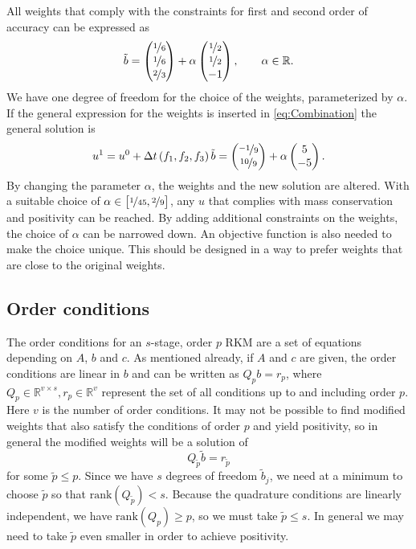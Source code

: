 \documentclass[a4paper]{article}
\numberwithin{equation}{section}
\theoremstyle{plain}
\theoremstyle{definition}
\numberwithin{theorem}{section}
\newcommand{\R}{\mathbb{R}}
\newcommand{\dt}{{\Delta t}}
\newcommand{\1}{\mathbbm{1}}
\newcommand{\bt}{\tilde{b}}
\newcommand{\pt}{{\tilde{p}}}
\begin{document}
All weights that comply with the constraints for first and second
order of accuracy can be expressed as
\begin{equation}
  \bt =
  \begin{pmatrix}
    \nicefrac{1}{6} \\
    \nicefrac{1}{6} \\
    \nicefrac{2}{3}
  \end{pmatrix}
  + \alpha \begin{pmatrix}
    \nicefrac{1}{2} \\
    \nicefrac{1}{2} \\
    -1
  \end{pmatrix},
  \qquad
  \alpha \in \R.
\end{equation}
We have one degree of freedom for the choice of the weights,
parameterized by $\alpha$.
If the general expression for the weights is inserted in
\eqref{eq:Combination} the general solution is
\begin{equation}
  u^{1}
  =
  u^0 + \dt \left(f_1, f_2, f_3\right) \bt
  =
  \begin{pmatrix}
    \nicefrac{-1}{9} \\
    \nicefrac{10}{9}
  \end{pmatrix}
  +\alpha \begin{pmatrix}
    5 \\
    -5
  \end{pmatrix}.
\end{equation}
By changing the parameter $\alpha$, the weights and the new
solution are altered. With a suitable choice of
$\alpha \in \left[ \nicefrac{1}{45}, \nicefrac{2}{9} \right]$,
any $u$ that complies with mass conservation and positivity can
be reached.
By adding additional constraints on the weights, the choice of
$\alpha$ can be narrowed down.
An objective function is also needed to make the choice unique. This should be designed in a way to prefer weights that are close to the original weights.


\subsection{Order conditions}\label{sec:OrderCond}

The order conditions for an $s$-stage, order $p$ RKM are a set of equations depending on $A$, $b$ and
$c$.  As mentioned already, if $A$ and $c$ are given, the order conditions are
linear in $b$ and can be written as $Q_p b = r_p$, where
$Q_p\in{\mathbb R}^{v\times s}, r_p\in{\mathbb R}^v$ represent the set of all conditions up to
and including order $p$. Here $v$ is the number of order conditions. It may not be possible to find modified weights
that also satisfy the conditions of order $p$ and yield positivity, so
in general the modified weights will be a solution of
$$
  Q_\pt \bt = r_\pt
$$
for some $\pt \le p$.   Since we have $s$ degrees of freedom $\bt_j$,  we need
at a minimum to choose $\pt$ so that $\mathrm{rank}(Q_\pt) < s$.
Because the quadrature conditions are linearly independent, we have $\mathrm{rank}(Q_p)\ge p$,
so we must take $\pt \le s$.  In general we may need to take $\pt$ even smaller
in order to achieve positivity.
\end{document}
